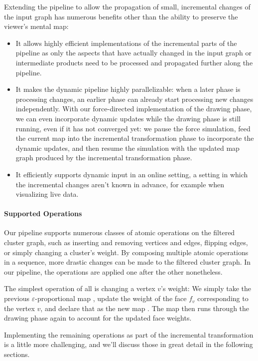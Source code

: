 Extending the pipeline to allow the propagation of small, incremental changes of the input graph has numerous benefits other than the ability to preserve the viewer's mental map:
%
\begin{itemize}
\item It allows highly efficient implementations of the incremental parts of the pipeline as only the aspects that have actually changed in the input graph or intermediate products need to be processed and propagated further along the pipeline.
\item It makes the dynamic pipeline highly parallelizable: when a later phase is processing changes, an earlier phase can already start processing new changes independently.
With our force-directed implementation of the drawing phase, we can even incorporate dynamic updates while the drawing phase is still running, even if it has not converged yet: we pause the force simulation, feed the current map  into the incremental transformation phase to incorporate the dynamic updates, and then resume the simulation with the updated map graph  produced by the incremental transformation phase.
\item It efficiently supports dynamic input in an online setting, \ie{} a setting in which the incremental changes aren't known in advance, for example when visualizing live data.
\end{itemize}



\paragraph{Supported Operations}

Our pipeline supports numerous classes of atomic operations on the filtered cluster graph, such as inserting and removing vertices and edges, flipping edges, or simply changing a cluster's weight.
By composing multiple atomic operations in a sequence, more drastic changes can be made to the filtered cluster graph.
In our pipeline, the operations are applied one after the other nonetheless.

The simplest operation of all is changing a vertex $v$'s weight:
We simply take the previous $\varepsilon$-proportional map , update the weight of the face $f_v$ corresponding to the vertex $v$, and declare that as the new map .
The map  then runs through the drawing phase again to account for the updated face weights.

Implementing the remaining operations as part of the incremental transformation is a little more challenging, and we'll discuss those in great detail in the following sections.

\clearpage

\clearpage

\clearpage

